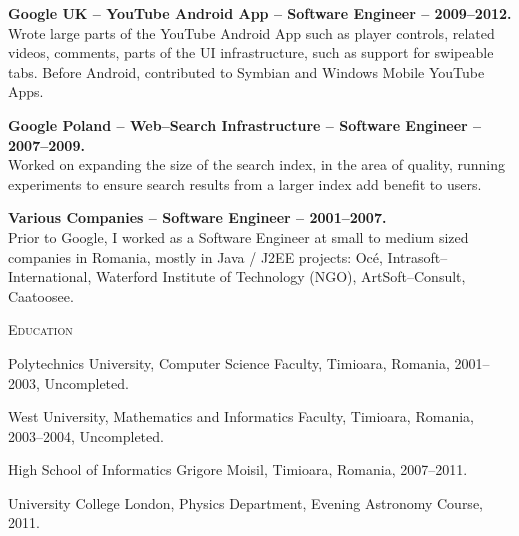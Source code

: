 \documentclass[10pt]{article}
\begin{document}
\begin{list}{}{\leftmargin=0em}
\item
{\bf Google UK -- YouTube Android App -- Software Engineer -- 2009--2012.}\\
Wrote large parts of the YouTube Android App such as player controls, related videos, comments, parts of the UI 
infrastructure, such as support for swipeable tabs.
Before Android, contributed to Symbian and Windows Mobile YouTube Apps.

\item
{\bf Google Poland -- Web--Search Infrastructure -- Software Engineer -- 2007--2009.}\\
Worked on expanding the size of the search index, in the area of quality, running experiments to ensure
search results from a larger index add benefit to users.

\item
{\bf Various Companies -- Software Engineer -- 2001--2007.}\\
Prior to Google, I worked as a Software Engineer at small to medium sized companies in Romania, mostly in Java / J2EE projects:
Oc\'e, Intrasoft--International, Waterford Institute of Technology (NGO), ArtSoft--Consult, Caatoosee.

\end{list}


\vspace{0.16in}

\noindent
\textcolor{Primary}{{\large \textsc{Education}}}
\begin{list}{}{\leftmargin=0em}
  \setlength{\itemsep}{1pt}
  \setlength{\parskip}{0pt}
  \setlength{\parsep}{0pt}
  \item Polytechnics University, Computer Science Faculty, Timioara, Romania, 2001--2003, Uncompleted.
  \item West University, Mathematics and Informatics Faculty, Timioara, Romania, 2003--2004, Uncompleted.
  \item High School of Informatics Grigore Moisil, Timioara, Romania, 2007--2011.
  \item University College London, Physics Department, Evening Astronomy Course, 2011.
\end{list}

\vspace{0.16in}
\end{document}
